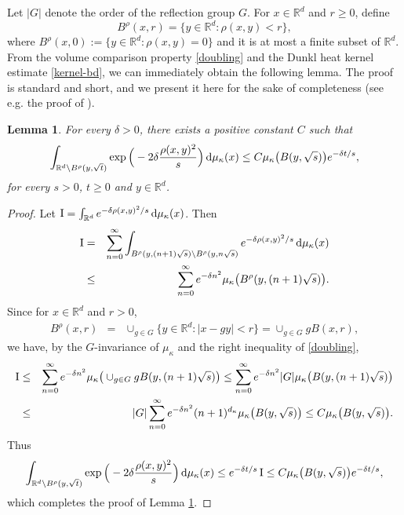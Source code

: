 \documentclass[11pt,a4paper]{article}
\def\R{\mathbb{R}}
\def\d{\textup{d}}
\newtheorem{lemma}[theorem]{Lemma}
\theoremstyle{definition}\newtheorem{remark}[theorem]{Remark}
\begin{document}
Let $|G|$ denote the order of the reflection group $G$. For $x\in\R^d$ and $r\geq0$, define
$$B^\rho(x,r)=\{y\in\R^d: \rho(x,y)<r\},$$
where $B^\rho(x,0):=\{y\in\R^d: \rho(x,y)=0\}$ and it is at most a finite subset of $\R^d$. From the volume comparison property \eqref{doubling} and the Dunkl heat kernel estimate \eqref{kernel-bd}, we can immediately obtain the following lemma. The proof is standard and short, and we present it here for the sake of completeness (see e.g. the proof of \cite[Lemma 2.1]{CoulhonDuong1999}).
\begin{lemma}\label{lemma-1}
For every $\delta>0$, there exists a positive constant $C$ such that
$$\int_{\R^d\setminus B^\rho(y,\sqrt{t})}\exp\Big(-2\delta\frac{\rho(x,y)^2}{s}\Big)\,\d\mu_\kappa(x)\leq C \mu_\kappa\big(B(y,\sqrt{s})\big)e^{-\delta t/s},$$
for every $s>0$, $t\geq0$ and $y\in\R^d$.
\end{lemma}
\begin{proof} Let ${\rm I}=\int_{\R^d}e^{-\delta\rho(x,y)^2/s}\,\d\mu_\kappa(x)$. Then
\begin{eqnarray*}
{\rm I}&=&\sum_{n=0}^\infty\int_{B^\rho(y,(n+1)\sqrt{s})\setminus B^\rho(y,n\sqrt{s})}e^{-\delta\rho(x,y)^2/s}\,\d\mu_\kappa(x)\\
&\leq&\sum_{n=0}^\infty e^{-\delta n^2}\mu_{\kappa}\big(B^\rho(y,(n+1)\sqrt{s})\big).
\end{eqnarray*}
Since for $x\in\R^d$ and $r>0$,
\begin{eqnarray*}
B^\rho(x,r)&=&\cup_{g\in G}\{y\in\R^d:|x-gy|<r\}
=\cup_{g\in G}g B(x,r),
 \end{eqnarray*}
we have, by the $G$-invariance of $\mu_\kappa$ and the right inequality of \eqref{doubling},
\begin{eqnarray*}
{\rm I}&\leq&\sum_{n=0}^\infty e^{-\delta n^2}\mu_{\kappa}\big(\cup_{g\in G} gB(y,(n+1)\sqrt{s})\big)\leq \sum_{n=0}^\infty e^{-\delta n^2}|G|\mu_{\kappa}\big(B(y,(n+1)\sqrt{s})\big)\\
&\leq&|G|\sum_{n=0}^\infty e^{-\delta n^2}(n+1)^{d_\kappa}\mu_\kappa\big(B(y,\sqrt{s})\big)\leq C\mu_\kappa\big(B(y,\sqrt{s})\big).
\end{eqnarray*}
Thus
$$\int_{\R^d\setminus B^\rho(y,\sqrt{t})}\exp\Big(-2\delta\frac{\rho(x,y)^2}{s}\Big)\,\d\mu_\kappa(x)\leq e^{-\delta t/s}\, {\rm I}
\leq C\mu_\kappa\big(B(y,\sqrt{s})\big)e^{-\delta t/s},$$
which completes the proof of Lemma \ref{lemma-1}.
\end{proof}
\end{document}

